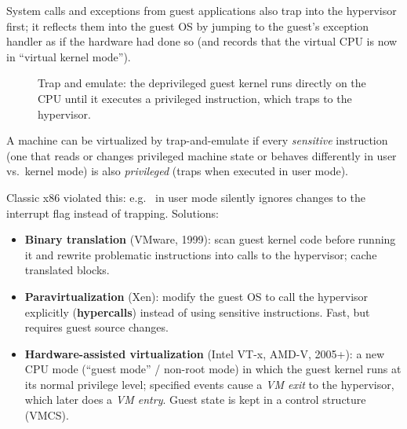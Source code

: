 System calls and exceptions from guest applications also trap into the hypervisor first; it
reflects them into the guest OS by jumping to the guest's exception handler as if the hardware
had done so (and records that the virtual CPU is now in ``virtual kernel mode'').

\begin{figure}[H]
\centering
{}
\caption{Trap and emulate: the deprivileged guest kernel runs directly on
the CPU until it executes a privileged instruction, which traps to the
hypervisor.}
\end{figure}

\begin{theorem}
A machine can be virtualized by trap-and-emulate if every \emph{sensitive} instruction (one that
reads or changes privileged machine state or behaves differently in user vs.\ kernel mode) is
also \emph{privileged} (traps when executed in user mode).
\end{theorem}

Classic x86 violated this: e.g.\  in user mode silently ignores changes to the
interrupt flag instead of trapping. Solutions:
\begin{itemize}
  \item \textbf{Binary translation} (VMware, 1999): scan guest kernel code before running it and
    rewrite problematic instructions into calls to the hypervisor; cache translated blocks.
  \item \textbf{Paravirtualization} (Xen): modify the guest OS to call the hypervisor explicitly
    (\textbf{hypercalls}) instead of using sensitive instructions. Fast, but requires guest source
    changes.
  \item \textbf{Hardware-assisted virtualization} (Intel VT-x, AMD-V, 2005+): a new CPU mode
    (``guest mode'' / non-root mode) in which the guest kernel runs at its normal privilege
    level; specified events cause a \emph{VM exit} to the hypervisor, which later does a
    \emph{VM entry}. Guest state is kept in a control structure (VMCS).
\end{itemize}

